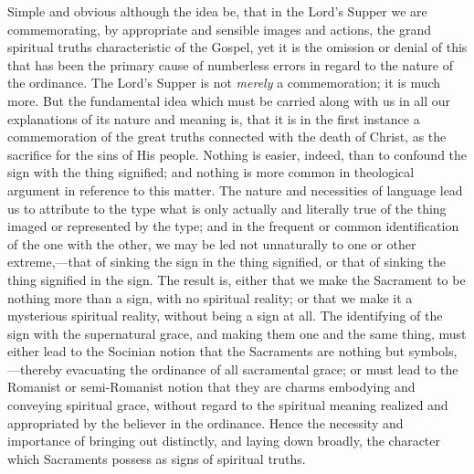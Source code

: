 \documentclass[
]{book}
\begin{document}
Simple and obvious although the idea be, that in the Lord's Supper we are commemorating, by appropriate and sensible images and actions, the grand spiritual truths characteristic of the Gospel, yet it is the omission or denial of this that has been the primary cause of numberless errors in regard to the nature of the ordinance. The Lord's Supper is not \emph{merely} a commemoration; it is much more. But the fundamental idea which must be carried along with us in all our explanations of its nature and meaning is, that it is in the first instance a commemoration of the great truths connected with the death of Christ, as the sacrifice for the sins of His people. Nothing is easier, indeed, than to confound the sign with the thing signified; and nothing is more common in theological argument in reference to this matter. The nature and necessities of language lead us to attribute to the type what is only actually and literally true of the thing imaged or represented by the type; and in the frequent or common identification of the one with the other, we may be led not unnaturally to one or other extreme,---that of sinking the sign in the thing signified, or that of sinking the thing signified in the sign. The result is, either that we make the Sacrament to be nothing more than a sign, with no spiritual reality; or that we make it a mysterious spiritual reality, without being a sign at all. The identifying of the sign with the supernatural grace, and making them one and the same thing, must either lead to the Socinian notion that the Sacraments are nothing but symbols,---thereby evacuating the ordinance of all sacramental grace; or must lead to the Romanist or semi-Romanist notion that they are charms embodying and conveying spiritual grace, without regard to the spiritual meaning realized and appropriated by the believer in the ordinance. Hence the necessity and importance of bringing out distinctly, and laying down broadly, the character which Sacraments possess as signs of spiritual truths.
\end{document}
